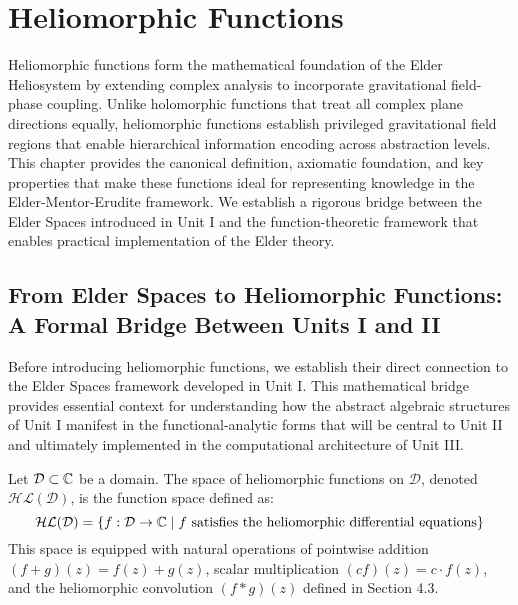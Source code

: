 \chapter{Heliomorphic Functions}

\begin{tcolorbox}[colback=blue!5!white,colframe=blue!75!black,title=Chapter Summary]
Heliomorphic functions form the mathematical foundation of the Elder Heliosystem by extending complex analysis to incorporate gravitational field-phase coupling. Unlike holomorphic functions that treat all complex plane directions equally, heliomorphic functions establish privileged gravitational field regions that enable hierarchical information encoding across abstraction levels. This chapter provides the canonical definition, axiomatic foundation, and key properties that make these functions ideal for representing knowledge in the Elder-Mentor-Erudite framework. We establish a rigorous bridge between the Elder Spaces introduced in Unit I and the function-theoretic framework that enables practical implementation of the Elder theory.
\end{tcolorbox}

\section{From Elder Spaces to Heliomorphic Functions: A Formal Bridge Between Units I and II}

Before introducing heliomorphic functions, we establish their direct connection to the Elder Spaces framework developed in Unit I. This mathematical bridge provides essential context for understanding how the abstract algebraic structures of Unit I manifest in the functional-analytic forms that will be central to Unit II and ultimately implemented in the computational architecture of Unit III.

\begin{definition}
Let $\mathcal{D} \subset \mathbb{C}$ be a domain. The space of heliomorphic functions on $\mathcal{D}$, denoted $\mathcal{HL}(\mathcal{D})$, is the function space defined as:
\begin{equation}
\mathcal{HL}(\mathcal{D}) = \left\{ f: \mathcal{D} \rightarrow \mathbb{C} \; \middle| \; f \text{ satisfies the heliomorphic differential equations} \right\}
\end{equation}
This space is equipped with natural operations of pointwise addition $(f+g)(z) = f(z) + g(z)$, scalar multiplication $(cf)(z) = c \cdot f(z)$, and the heliomorphic convolution $(f * g)(z)$ defined in Section 4.3.
\end{definition}

